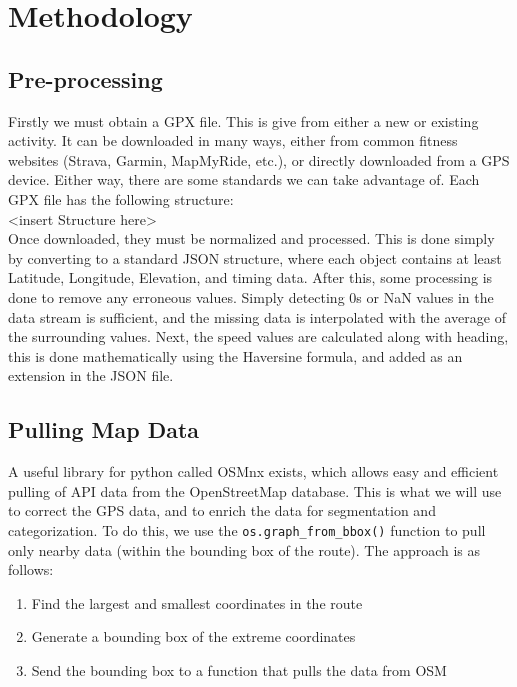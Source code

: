 \documentclass[12pt,a4paper]{report}
\begin{document}
\tableofcontents
\newpage
\section{Methodology}

\subsection{Pre-processing}
Firstly we must obtain a GPX file. This is give from either a new or existing activity. It can be downloaded in many ways, either from common fitness websites (Strava, Garmin, MapMyRide, etc.), or directly
downloaded from a GPS device. Either way, there are some standards we can take advantage of. Each GPX file has the following structure:
\\ <insert Structure here>
\\
Once downloaded, they must be normalized and processed. This is done simply by converting to a standard JSON structure, where each object contains at least Latitude, Longitude, Elevation, and timing data.
After this, some processing is done to remove any erroneous values. Simply detecting 0s or NaN values in the data stream is sufficient, and the missing data is interpolated with the average of the surrounding values.
Next, the speed values are calculated along with heading, this is done mathematically using the Haversine formula, and added as an extension in the JSON file.

\subsection{Pulling Map Data}
A useful library for python called OSMnx exists, which allows easy and efficient pulling of API data from the OpenStreetMap database. This is what we will use to correct the GPS data, and to enrich the data for segmentation and categorization.
To do this, we use the \texttt{os.graph\_from\_bbox()} function to pull only nearby data (within the bounding box of the route). The approach is as follows:
\begin{enumerate}
	\item Find the largest and smallest coordinates in the route
	\item Generate a bounding box of the extreme coordinates
	\item Send the bounding box to a function that pulls the data from OSM
\end{enumerate}


\end{document}
